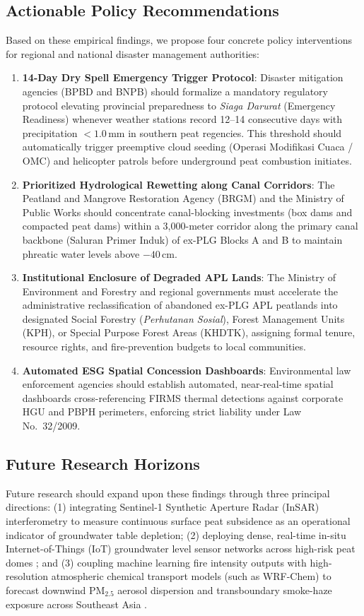 \subsection{Actionable Policy Recommendations}
\label{subsec:concl_policy}

Based on these empirical findings, we propose four concrete policy interventions for regional and national disaster management authorities:
\begin{enumerate}
    \item \textbf{14-Day Dry Spell Emergency Trigger Protocol}: Disaster mitigation agencies (BPBD and BNPB) should formalize a mandatory regulatory protocol elevating provincial preparedness to \textit{Siaga Darurat} (Emergency Readiness) whenever weather stations record 12--14 consecutive days with precipitation $<1.0$\,mm in southern peat regencies. This threshold should automatically trigger preemptive cloud seeding (Operasi Modifikasi Cuaca / OMC) and helicopter patrols before underground peat combustion initiates.
    \item \textbf{Prioritized Hydrological Rewetting along Canal Corridors}: The Peatland and Mangrove Restoration Agency (BRGM) and the Ministry of Public Works should concentrate canal-blocking investments (box dams and compacted peat dams) within a 3,000-meter corridor along the primary canal backbone (Saluran Primer Induk) of ex-PLG Blocks A and B to maintain phreatic water levels above $-40$\,cm.
    \item \textbf{Institutional Enclosure of Degraded APL Lands}: The Ministry of Environment and Forestry and regional governments must accelerate the administrative reclassification of abandoned ex-PLG APL peatlands into designated Social Forestry (\textit{Perhutanan Sosial}), Forest Management Units (KPH), or Special Purpose Forest Areas (KHDTK), assigning formal tenure, resource rights, and fire-prevention budgets to local communities.
    \item \textbf{Automated ESG Spatial Concession Dashboards}: Environmental law enforcement agencies should establish automated, near-real-time spatial dashboards cross-referencing FIRMS thermal detections against corporate HGU and PBPH perimeters, enforcing strict liability under Law No.~32/2009.
\end{enumerate}

\subsection{Future Research Horizons}
\label{subsec:concl_future}

Future research should expand upon these findings through three principal directions: (1) integrating Sentinel-1 Synthetic Aperture Radar (InSAR) interferometry to measure continuous surface peat subsidence as an operational indicator of groundwater table depletion; (2) deploying dense, real-time in-situ Internet-of-Things (IoT) groundwater level sensor networks across high-risk peat domes \citep{Dadap2021NatComm}; and (3) coupling machine learning fire intensity outputs with high-resolution atmospheric chemical transport models (such as WRF-Chem) to forecast downwind $\text{PM}_{2.5}$ aerosol dispersion and transboundary smoke-haze exposure across Southeast Asia \citep{Kiely2021ACP}.
